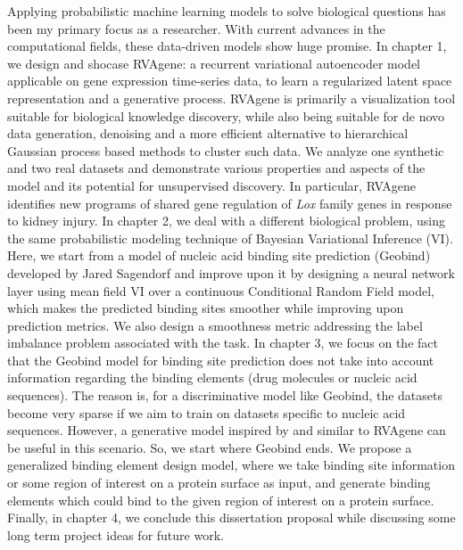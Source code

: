 Applying probabilistic machine learning models to solve biological questions has been my primary focus as a researcher. 
With current advances in the computational fields, these data-driven models show huge promise. 
In chapter 1, we design and shocase RVAgene: a recurrent variational
autoencoder model applicable on gene expression time-series data, to learn a regularized latent
space representation and a generative process. RVAgene is primarily a visualization tool suitable for biological 
knowledge discovery, while also being suitable for de novo data generation, denoising and a more
efficient alternative to hierarchical Gaussian process based methods to cluster such data. We
analyze one synthetic and two real datasets and demonstrate various properties and aspects of the
model and its potential for unsupervised discovery.  In particular, RVAgene identifies new programs of 
shared gene regulation of \textit{Lox} family genes in response to kidney injury. In
chapter 2, we deal with a different biological problem, using the same probabilistic modeling
technique of Bayesian Variational Inference (VI). Here, we start from a model of nucleic acid binding site
prediction (Geobind) developed by Jared Sagendorf and improve upon it by designing a neural network layer using mean field
VI over a continuous Conditional Random Field model, which makes the predicted binding sites
smoother while improving upon prediction metrics. We also design a smoothness metric
addressing the label imbalance problem associated with the task. In chapter 3, we focus on the fact that the Geobind
model for binding site prediction does not take into account information regarding the binding
elements (drug molecules or nucleic acid sequences). The reason is, for a discriminative model like
Geobind, the datasets become very sparse if we aim to train on datasets specific to nucleic acid
sequences. However, a generative model inspired by and similar to RVAgene can be useful in this
scenario. So, we start where Geobind ends. We propose a generalized binding element design model, where we take binding site
information or some region of interest on a protein surface as input, and generate binding elements which
could bind to the given region of interest on a protein surface. Finally, in chapter 4, we conclude
this dissertation proposal while discussing some long term project ideas for future work.

